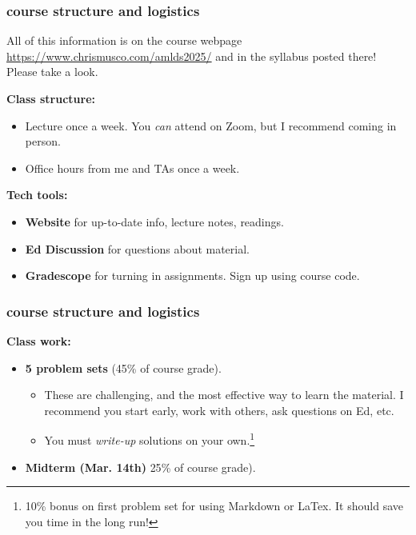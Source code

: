 \documentclass[]{beamer}
\begin{document}
	\begin{frame}
		\frametitle{course structure and logistics}
		\begin{center}
			All of this information is on the course webpage \url{https://www.chrismusco.com/amlds2025/} and in the syllabus posted there! Please take a look.
		\end{center}
		
		\textbf{Class structure:}
		\begin{itemize}
			\item Lecture once a week. You \emph{can} attend on Zoom, but I recommend coming in person.
			\item Office hours from me and TAs once a week.
		\end{itemize}
		
		\textbf{Tech tools:}
		\begin{itemize}
			\item \textbf{Website} for up-to-date info, lecture notes, readings.
			\item \textbf{Ed Discussion} for questions about material. 
			\item \textbf{Gradescope} for turning in assignments. Sign up using course code.
		\end{itemize}
		
		\begin{center}
		\end{center}
	\end{frame}
	
	
	
	\begin{frame}
		\frametitle{course structure and logistics}
		\textbf{Class work:}
		\begin{itemize}
			\item \textbf{5 problem sets} (45\% of course grade). 
			\begin{itemize}
				\item These are challenging, and the most effective way to learn the material. I recommend you start early, work with others, ask questions on Ed, etc.
				\item You must \emph{write-up} solutions on your own.\footnote{10\% bonus on first problem set for using Markdown or LaTex. It should save you time in the long run!} 
			\end{itemize}
			\item \textbf{Midterm (Mar. 14th)} {25}\% of course grade). 
		\end{itemize}
	\end{frame}
	
\end{document}

